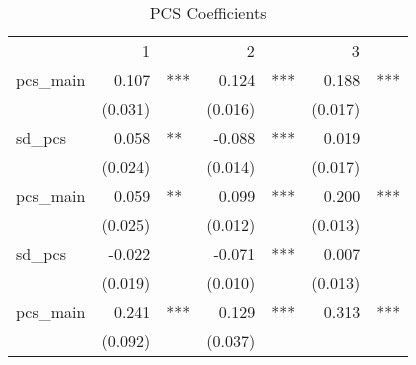 \begin{table}[!h]
\caption{PCS Coefficients}
\centering
\begin{tabular}{lllllll}
\cline{1-7}
\multicolumn{1}{r}{} &
  \multicolumn{2}{c}{1} &
  \multicolumn{2}{c}{2} &
  \multicolumn{2}{c}{3} \\
\cline{1-7}
\multicolumn{1}{l}{pcs\_main} &
  \multicolumn{1}{r}{0.107} &
  \multicolumn{1}{l}{***} &
  \multicolumn{1}{r}{0.124} &
  \multicolumn{1}{l}{***} &
  \multicolumn{1}{r}{0.188} &
  \multicolumn{1}{l}{***} \\
\multicolumn{1}{l}{} &
  \multicolumn{1}{r}{(0.031)} &
  \multicolumn{1}{l}{} &
  \multicolumn{1}{r}{(0.016)} &
  \multicolumn{1}{l}{} &
  \multicolumn{1}{r}{(0.017)} &
  \multicolumn{1}{l}{} \\
\multicolumn{1}{l}{sd\_pcs} &
  \multicolumn{1}{r}{0.058} &
  \multicolumn{1}{l}{**} &
  \multicolumn{1}{r}{-0.088} &
  \multicolumn{1}{l}{***} &
  \multicolumn{1}{r}{0.019} &
  \multicolumn{1}{l}{} \\
\multicolumn{1}{l}{} &
  \multicolumn{1}{r}{(0.024)} &
  \multicolumn{1}{l}{} &
  \multicolumn{1}{r}{(0.014)} &
  \multicolumn{1}{l}{} &
  \multicolumn{1}{r}{(0.017)} &
  \multicolumn{1}{l}{} \\
\multicolumn{1}{l}{pcs\_main} &
  \multicolumn{1}{r}{0.059} &
  \multicolumn{1}{l}{**} &
  \multicolumn{1}{r}{0.099} &
  \multicolumn{1}{l}{***} &
  \multicolumn{1}{r}{0.200} &
  \multicolumn{1}{l}{***} \\
\multicolumn{1}{l}{} &
  \multicolumn{1}{r}{(0.025)} &
  \multicolumn{1}{l}{} &
  \multicolumn{1}{r}{(0.012)} &
  \multicolumn{1}{l}{} &
  \multicolumn{1}{r}{(0.013)} &
  \multicolumn{1}{l}{} \\
\multicolumn{1}{l}{sd\_pcs} &
  \multicolumn{1}{r}{-0.022} &
  \multicolumn{1}{l}{} &
  \multicolumn{1}{r}{-0.071} &
  \multicolumn{1}{l}{***} &
  \multicolumn{1}{r}{0.007} &
  \multicolumn{1}{l}{} \\
\multicolumn{1}{l}{} &
  \multicolumn{1}{r}{(0.019)} &
  \multicolumn{1}{l}{} &
  \multicolumn{1}{r}{(0.010)} &
  \multicolumn{1}{l}{} &
  \multicolumn{1}{r}{(0.013)} &
  \multicolumn{1}{l}{} \\
\multicolumn{1}{l}{pcs\_main} &
  \multicolumn{1}{r}{0.241} &
  \multicolumn{1}{l}{***} &
  \multicolumn{1}{r}{0.129} &
  \multicolumn{1}{l}{***} &
  \multicolumn{1}{r}{0.313} &
  \multicolumn{1}{l}{***} \\
\multicolumn{1}{l}{} &
  \multicolumn{1}{r}{(0.092)} &
  \multicolumn{1}{l}{} &
  \multicolumn{1}{r}{(0.037)} &

\end{tabular}
\end{table}
